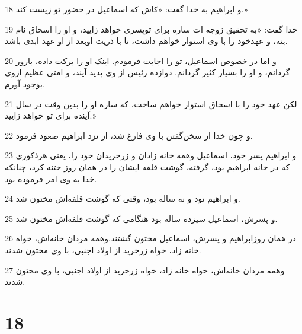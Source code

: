 \par 18 و ابراهیم به خدا گفت: «کاش که اسماعیل در حضور تو زیست کند.»
\par 19 خدا گفت: «به تحقیق زوجه ات ساره برای توپسری خواهد زایید، و او را اسحاق نام بنه، و عهدخود را با وی استوار خواهم داشت، تا با ذریت اوبعد از او عهد ابدی باشد.
\par 20 و اما در خصوص اسماعیل، تو را اجابت فرمودم. اینک او را برکت داده، بارور گردانم، و او را بسیار کثیر گردانم. دوازده رئیس از وی پدید آیند، و امتی عظیم ازوی بوجود آورم.
\par 21 لکن عهد خود را با اسحاق استوار خواهم ساخت، که ساره او را بدین وقت در سال آینده برای تو خواهد زایید.»
\par 22 و چون خدا از سخن‌گفتن با وی فارغ شد، از نزد ابراهیم صعود فرمود.
\par 23 و ابراهیم پسر خود، اسماعیل وهمه خانه زادان و زرخریدان خود را، یعنی هرذکوری که در خانه ابراهیم بود، گرفته، گوشت قلفه ایشان را در همان روز ختنه کرد، چنانکه خدا به وی امر فرموده بود.
\par 24 و ابراهیم نود و نه ساله بود، وقتی که گوشت قلفه‌اش مختون شد.
\par 25 و پسرش، اسماعیل سیزده ساله بود هنگامی که گوشت قلفه‌اش مختون شد.
\par 26 در همان روزابراهیم و پسرش، اسماعیل مختون گشتند.وهمه مردان خانه‌اش، خواه خانه زاد، خواه زرخرید از اولاد اجنبی، با وی مختون شدند.
\par 27 وهمه مردان خانه‌اش، خواه خانه زاد، خواه زرخرید از اولاد اجنبی، با وی مختون شدند.
 
\chapter{18}

